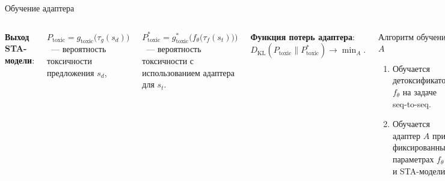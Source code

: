 \documentclass[12pt, fleqn, xcolor=x11names, xcolor=table, aspectratio=169]{beamer}
\begin{document}

\begin{frame}{Обучение адаптера}
\begin{columns}[c]

\textbf{Выход STA-модели}:

$P_{\text{toxic}} =g_{\text{toxic}}\bigl(\tau_{g}(s_d) \bigr)$~--- вероятность токсичности предложения $s_d$,

$P^{*}_{\text{toxic}} = g^{*}_{\text{toxic}} \bigl(f_{\theta} \bigl(\tau_{f}(s_t)\bigr) \bigr)$~--- вероятность токсичности с использованием адаптера для $s_t$. 

 

\vfill

\textbf{Функция потерь адаптера}: 
$D_\text{KL}(P_{\text{toxic}} \parallel P^{*}_{\text{toxic}}) \longrightarrow \min_{A}.$

\vfill

\begin{alertblock}{Алгоритм обучения $A$}
\begin{enumerate}
    \item Обучается детоксификатор $f_{\theta}$ на задаче seq-to-seq.
    \item Обучается адаптер $A$ при фиксированных параметрах $f_{\theta}$ и STA-модели.
\end{enumerate}
\end{alertblock}

\includegraphics[width=1.5\textwidth, left]{images/pres_adapter_train2.pdf}
\end{columns} 
\end{frame}
\end{document}
